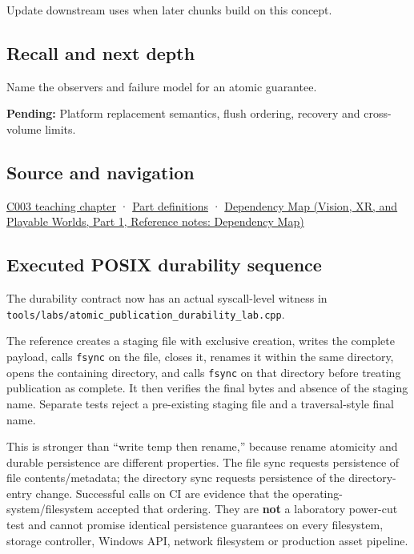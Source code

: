 \hypertarget{appendix-e89a8f290ef5-used-by}{}

Update downstream uses when later chunks build on this concept.

\subsection{Recall and next depth}\label{appendix-e89a8f290ef5-recall-and-next-depth}

\hypertarget{appendix-e89a8f290ef5-recall-and-next-depth}{}

Name the observers and failure model for an atomic guarantee.

\textbf{Pending:} Platform replacement semantics, flush ordering, recovery and cross-volume limits.

\subsection{Source and navigation}\label{appendix-e89a8f290ef5-source-and-navigation}

\hypertarget{appendix-e89a8f290ef5-source-and-navigation}{}

\hyperref[01-foundations-i-ch002-where-the-bytes-live]{C003 teaching chapter} · \hyperref[appendix-fd090d982a15-m003---parts-41-60]{Part definitions} · \href{../07-Vision-XR-and-Playable-Worlds-P01/main.pdf\#nameddest=appendix-4ad47bdd269a}{Dependency Map (Vision, XR, and Playable Worlds, Part 1, Reference notes: Dependency Map)}

\subsection{Executed POSIX durability sequence}\label{appendix-e89a8f290ef5-executed-posix-durability-sequence}

\hypertarget{appendix-e89a8f290ef5-executed-posix-durability-sequence}{}

The durability contract now has an actual syscall-level witness in \texttt{tools/labs/atomic\_publication\_durability\_lab.cpp}.

The reference creates a staging file with exclusive creation, writes the complete payload, calls \texttt{fsync} on the file, closes it, renames it within the same directory, opens the containing directory, and calls \texttt{fsync} on that directory before treating publication as complete. It then verifies the final bytes and absence of the staging name. Separate tests reject a pre-existing staging file and a traversal-style final name.

This is stronger than ``write temp then rename,'' because rename atomicity and durable persistence are different properties. The file sync requests persistence of file contents/metadata; the directory sync requests persistence of the directory-entry change. Successful calls on CI are evidence that the operating-system/filesystem accepted that ordering. They are \textbf{not} a laboratory power-cut test and cannot promise identical persistence guarantees on every filesystem, storage controller, Windows API, network filesystem or production asset pipeline.
